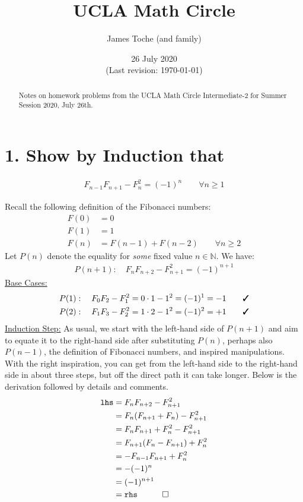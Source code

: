 \documentclass[12pt]{article}
\title{UCLA Math Circle}
\author{James Toche (and family)}
\date{26 July 2020 \\(Last revision: \today)}
\begin{document}
\begin{minipage}{\textwidth}
\maketitle
\begin{abstract}
Notes on homework problems from the UCLA Math Circle Intermediate-2 for Summer Session 2020, July 26th. 
\end{abstract}
\end{minipage}

\newpage
\section*{1. Show by Induction that}
\begin{question}
  \begin{align*}
  F_{n-1}F_{n+1} - F_{n}^{2} = (-1)^{n} \qquad \forall n\geq 1
  \end{align*}
\end{question}
Recall the following definition of the Fibonacci numbers:
\begin{align*}
F(0) & = 0 \\
F(1) & = 1 \\
F(n) & = F(n-1) + F(n-2) \qquad \forall n\geq 2
\end{align*}
Let $P(n)$ denote	the equality for \textit{some} fixed value $n\in\mathbb{N}$. We have:
\begin{align*}
P(n+1): \quad
  F_{n}F_{n+2} - F_{n+1}^{2} = (-1)^{n+1}
\end{align*}
\underline{Base Cases:}
\begin{align*}
P(1): \quad
  F_{0}F_{2} - F_{1}^{2} = 0 \cdot 1 - 1^{2} = (-1)^{1} &= -1 \qquad \cmark \\
P(2): \quad
  F_{1}F_{3} - F_{2}^{2} = 1 \cdot 2 - 1^{2} = (-1)^{2} &= +1 \qquad \cmark 
\end{align*}
\underline{Induction Step:}
As usual, we start with the left-hand side of $P(n+1)$ and aim to equate it to the right-hand side after substituting $P(n)$, perhaps also $P(n-1)$, the definition of Fibonacci numbers, and inspired manipulations. With the right inspiration, you can get from the left-hand side to the right-hand side in about three steps, but off the direct path it can take longer. Below is the derivation followed by details and comments. 
\begin{align*}
\texttt{lhs}
  & = F_{n} F_{n+2} - F_{n+1}^{2} \\
  & = F_{n} (F_{n+1}+F_{n}) - F_{n+1}^{2} \\
  & = F_{n} F_{n+1} + F_{n}^{2} - F_{n+1}^{2} \\
  & = F_{n+1} (F_{n}-F_{n+1}) + F_{n}^{2} \\
  & = -F_{n-1} F_{n+1} + F_{n}^{2} \\
  & = -(-1)^{n} \\
  & = (-1)^{n+1} \\
  & = \texttt{rhs} \quad \qed 
\end{align*}
\end{document}

